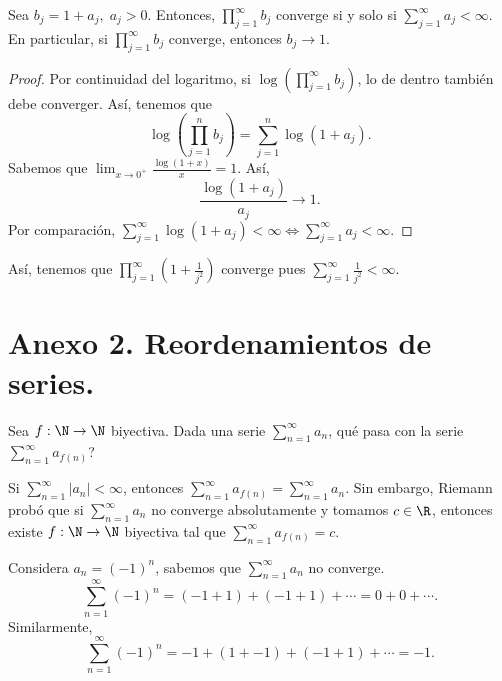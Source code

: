 \begin{ftheorem}[]
	\normalfont Sea $\displaystyle b_{j} = 1 + a_{j}, \; a_{j}>0 $. Entonces, $\displaystyle \prod^{\infty}_{j=1}b_{j} $ converge si y solo si $\displaystyle \sum^{\infty}_{j=1}a_{j} < \infty $. En particular, si $\displaystyle \prod^{\infty}_{j=1}b_{j} $ converge, entonces $\displaystyle b_{j} \to 1 $.
\end{ftheorem}

\begin{proof}
Por continuidad del logaritmo, si $\displaystyle \log\left(\prod^{\infty}_{j=1}b_{j}\right) $, lo de dentro también debe converger. Así, tenemos que
\[\log\left(\prod^{n}_{j=1}b_{j}\right) = \sum^{n}_{j=1}\log\left(1+a_{j}\right) .\]
Sabemos que $\displaystyle \lim_{x \to 0^{+}}\frac{\log\left(1 + x\right)}{x} = 1 $. Así,
\[\frac{\log\left(1 + a_{j}\right)}{a_{j}}\to 1 .\]
Por comparación, $\displaystyle \sum^{\infty}_{j=1}\log\left(1+a_{j}\right) < \infty \iff \sum^{\infty}_{j=1}a_{j} < \infty $.
\end{proof}

\begin{eg}
\normalfont Así, tenemos que $\displaystyle \prod^{\infty}_{j=1}\left(1 + \frac{1}{j^{2}}\right) $ converge pues $\displaystyle \sum^{\infty}_{j=1}\frac{1}{j^{2}}<\infty $.
\end{eg}

\section{Anexo 2. Reordenamientos de series.}

Sea $\displaystyle f: \N \to \N $ biyectiva. Dada una serie $\displaystyle \sum^{\infty}_{n = 1}a_{n} $, qué pasa con la serie $\displaystyle \sum^{\infty}_{n = 1}a_{f\left(n\right)} $?
\begin{ftheorem}[]
\normalfont Si $\displaystyle \sum^{\infty}_{n = 1} \left|a_{n}\right| < \infty $, entonces $\displaystyle \sum^{\infty}_{n = 1} a_{f\left(n\right)} = \sum^{\infty}_{n = 1}a_{n} $. Sin embargo, Riemann probó que si $\displaystyle \sum^{\infty}_{n = 1}a_{n} $ no converge absolutamente y tomamos $\displaystyle c \in \R $, entonces existe $\displaystyle f : \N \to \N $ biyectiva tal que $\displaystyle \sum^{\infty}_{n = 1}a_{f\left(n\right)} = c . $ 
\end{ftheorem}

\begin{eg}
\normalfont Considera $\displaystyle a_{n} = \left(-1\right)^{n} $, sabemos que $\displaystyle \sum^{\infty}_{n = 1}a_{n} $ no converge. 
\[\sum^{\infty}_{n=1}\left(-1\right)^{n} = \left(-1+1\right) + \left(-1+1\right) + \cdots = 0 + 0 + \cdots .\]
Similarmente, 
\[\sum^{\infty}_{n = 1}\left(-1\right)^{n} = -1 + \left(1 + -1\right) + \left(-1+1\right) + \cdots = -1 .\]
\end{eg}

